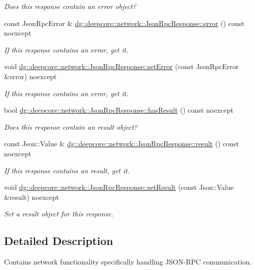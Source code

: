 \begin{DoxyCompactItemize}
\begin{DoxyCompactList}\small\item\em Does this response contain an error object? \end{DoxyCompactList}\item 
const Json\+Rpc\+Error \& \hyperlink{group___network_module_ga7a8d72cacfd617c8aa04d3ef973e3d19}{dg\+::deepcore\+::network\+::\+Json\+Rpc\+Response\+::error} () const noexcept
\begin{DoxyCompactList}\small\item\em If this response contains an error, get it. \end{DoxyCompactList}\item 
void \hyperlink{group___network_module_ga47913460de543d08ee67b2d263a49b37}{dg\+::deepcore\+::network\+::\+Json\+Rpc\+Response\+::set\+Error} (const Json\+Rpc\+Error \&error) noexcept
\begin{DoxyCompactList}\small\item\em If this response contains an error, get it. \end{DoxyCompactList}\item 
bool \hyperlink{group___network_module_ga6bce2bddf5eb24775a682dd8078d1392}{dg\+::deepcore\+::network\+::\+Json\+Rpc\+Response\+::has\+Result} () const noexcept
\begin{DoxyCompactList}\small\item\em Does this response contain an result object? \end{DoxyCompactList}\item 
const Json\+::\+Value \& \hyperlink{group___network_module_gaff7247fb07139f7e6f620020f3a00224}{dg\+::deepcore\+::network\+::\+Json\+Rpc\+Response\+::result} () const noexcept
\begin{DoxyCompactList}\small\item\em If this response contains an result, get it. \end{DoxyCompactList}\item 
void \hyperlink{group___network_module_ga70614bdc02d6aeca557c21644305a72a}{dg\+::deepcore\+::network\+::\+Json\+Rpc\+Response\+::set\+Result} (const Json\+::\+Value \&result) noexcept
\begin{DoxyCompactList}\small\item\em Set a result object for this response. \end{DoxyCompactList}\end{DoxyCompactItemize}


\subsection{Detailed Description}
Contains network functionality specifically handling J\+S\+O\+N-\/\+R\+PC communication. 

